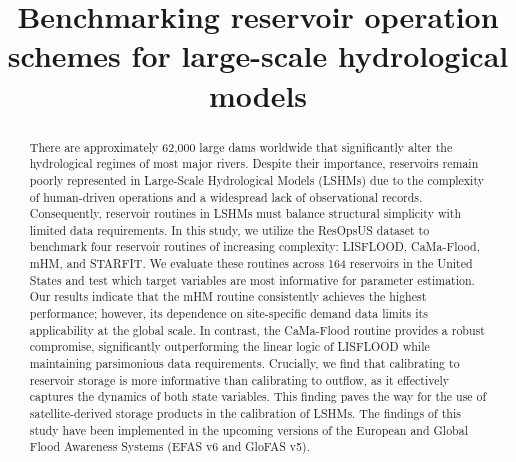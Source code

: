 \documentclass[hess, manuscript]{copernicus}
\begin{document}
\title{Benchmarking reservoir operation schemes for large-scale hydrological models}




\received{}
\pubdiscuss{} %
\revised{}
\accepted{}
\published{}



\maketitle



\begin{abstract}
There are approximately 62,000 large dams worldwide that significantly alter the hydrological regimes of most major rivers. Despite their importance, reservoirs remain poorly represented in Large-Scale Hydrological Models (LSHMs) due to the complexity of human-driven operations and a widespread lack of observational records. Consequently, reservoir routines in LSHMs must balance structural simplicity with limited data requirements. In this study, we utilize the ResOpsUS dataset to benchmark four reservoir routines of increasing complexity: LISFLOOD, CaMa-Flood, mHM, and STARFIT. We evaluate these routines across 164 reservoirs in the United States and test which target variables are most informative for parameter estimation. Our results indicate that the mHM routine consistently achieves the highest performance; however, its dependence on site-specific demand data limits its applicability at the global scale. In contrast, the CaMa-Flood routine provides a robust compromise, significantly outperforming the linear logic of LISFLOOD while maintaining parsimonious data requirements. Crucially, we find that calibrating to reservoir storage is more informative than calibrating to outflow, as it effectively captures the dynamics of both state variables. This finding paves the way for the use of satellite-derived storage products in the calibration of LSHMs. The findings of this study have been implemented in the upcoming versions of the European and Global Flood Awareness Systems (EFAS v6 and GloFAS v5).
\end{abstract}
\end{document}
